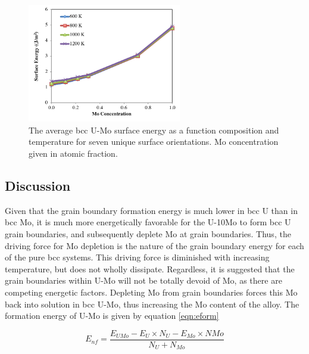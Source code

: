 \documentclass[review]{elsarticle}
\begin{document}
\begin{figure}[h]
 \centering
 \includegraphics[width=0.6\textwidth]{umoavgsurf.png} 
 \caption{The average bcc U-Mo surface energy as a function composition and temperature for seven unique surface orientations. Mo concentration given in atomic fraction.}
 \label{fig:avgvsmoS}
\end{figure}

\FloatBarrier

\subsection{Discussion}

Given that the grain boundary formation energy is much lower in bcc U than in bcc Mo, it is much more energetically favorable for the U-10Mo to form bcc U grain boundaries, and subsequently deplete Mo at grain boundaries. Thus, the driving force for Mo depletion is the nature of the grain boundary energy for each of the pure bcc systems. This driving force is diminished with increasing temperature, but does not wholly dissipate. Regardless, it is suggested that the grain boundaries within U-Mo will not be totally devoid of Mo, as there are competing energetic factors. Depleting Mo from grain boundaries forces this Mo back into solution in bcc U-Mo, thus increasing the Mo content of the alloy. The formation energy of U-Mo is given by equation \ref{eqn:eform}

\begin{equation}
\label{eqn:eform}
E_{nf}= \frac{ E_{UMo} - E_{U} \times N_{U} - E_{Mo} \times N{Mo} }{ N_{U} + N_{Mo} }
\end{equation}
\end{document}
